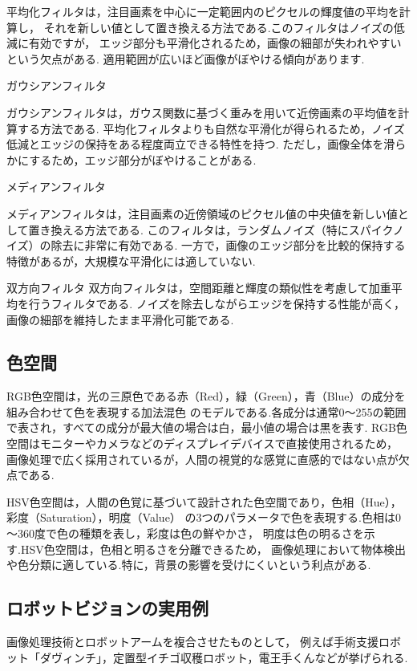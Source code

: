 平均化フィルタは，注目画素を中心に一定範囲内のピクセルの輝度値の平均を計算し，
それを新しい値として置き換える方法である.このフィルタはノイズの低減に有効ですが，
エッジ部分も平滑化されるため，画像の細部が失われやすいという欠点がある.
適用範囲が広いほど画像がぼやける傾向があります.

ガウシアンフィルタ

ガウシアンフィルタは，ガウス関数に基づく重みを用いて近傍画素の平均値を計算する方法である.
平均化フィルタよりも自然な平滑化が得られるため，ノイズ低減とエッジの保持をある程度両立できる特性を持つ.
ただし，画像全体を滑らかにするため，エッジ部分がぼやけることがある.

メディアンフィルタ

メディアンフィルタは，注目画素の近傍領域のピクセル値の中央値を新しい値として置き換える方法である.
このフィルタは，ランダムノイズ（特にスパイクノイズ）の除去に非常に有効である.
一方で，画像のエッジ部分を比較的保持する特徴があるが，大規模な平滑化には適していない.

双方向フィルタ
双方向フィルタは，空間距離と輝度の類似性を考慮して加重平均を行うフィルタである.
ノイズを除去しながらエッジを保持する性能が高く，画像の細部を維持したまま平滑化可能である.

\subsection{色空間}
RGB色空間は，光の三原色である赤（Red），緑（Green），青（Blue）の成分を組み合わせて色を表現する加法混色
のモデルである.各成分は通常0～255の範囲で表され，すべての成分が最大値の場合は白，最小値の場合は黒を表す.
RGB色空間はモニターやカメラなどのディスプレイデバイスで直接使用されるため，
画像処理で広く採用されているが，人間の視覚的な感覚に直感的ではない点が欠点である.

HSV色空間は，人間の色覚に基づいて設計された色空間であり，色相（Hue），彩度（Saturation），明度（Value）
の3つのパラメータで色を表現する.色相は0～360度で色の種類を表し，彩度は色の鮮やかさ，
明度は色の明るさを示す.HSV色空間は，色相と明るさを分離できるため，
画像処理において物体検出や色分類に適している.特に，背景の影響を受けにくいという利点がある.

\subsection{ロボットビジョンの実用例}
画像処理技術とロボットアームを複合させたものとして，
例えば手術支援ロボット「ダヴィンチ」，定置型イチゴ収穫ロボット，電王手くんなどが挙げられる.

